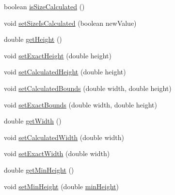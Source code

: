 \begin{DoxyCompactItemize}
\item 
boolean \hyperlink{classorg_1_1tzi_1_1use_1_1gui_1_1views_1_1diagrams_1_1elements_1_1_placeable_node_a0e797fd4108ca62f9ea10d1478273c78}{is\-Size\-Calculated} ()
\item 
void \hyperlink{classorg_1_1tzi_1_1use_1_1gui_1_1views_1_1diagrams_1_1elements_1_1_placeable_node_ae72445d4803c4eb6203d8f222cd99246}{set\-Size\-Is\-Calculated} (boolean new\-Value)
\item 
double \hyperlink{classorg_1_1tzi_1_1use_1_1gui_1_1views_1_1diagrams_1_1elements_1_1_placeable_node_a3f1e17dd59e232348e59858bba8645ed}{get\-Height} ()
\item 
void \hyperlink{classorg_1_1tzi_1_1use_1_1gui_1_1views_1_1diagrams_1_1elements_1_1_placeable_node_ad3166569d3ffc67d1f14fbac8b733ad4}{set\-Exact\-Height} (double height)
\item 
void \hyperlink{classorg_1_1tzi_1_1use_1_1gui_1_1views_1_1diagrams_1_1elements_1_1_placeable_node_a2ca255a92f6450ae6dc63742a5f3828e}{set\-Calculated\-Height} (double height)
\item 
void \hyperlink{classorg_1_1tzi_1_1use_1_1gui_1_1views_1_1diagrams_1_1elements_1_1_placeable_node_a61392a53892e2e72f9973f2ab5c0fc48}{set\-Calculated\-Bounds} (double width, double height)
\item 
void \hyperlink{classorg_1_1tzi_1_1use_1_1gui_1_1views_1_1diagrams_1_1elements_1_1_placeable_node_a303f02a878c532e867d8ce2e0e8a3322}{set\-Exact\-Bounds} (double width, double height)
\item 
double \hyperlink{classorg_1_1tzi_1_1use_1_1gui_1_1views_1_1diagrams_1_1elements_1_1_placeable_node_a4f60e88c8c835e9d5e6822c8ea433c67}{get\-Width} ()
\item 
void \hyperlink{classorg_1_1tzi_1_1use_1_1gui_1_1views_1_1diagrams_1_1elements_1_1_placeable_node_a56437e4a70913d50e5e55f1a42e7d51c}{set\-Calculated\-Width} (double width)
\item 
void \hyperlink{classorg_1_1tzi_1_1use_1_1gui_1_1views_1_1diagrams_1_1elements_1_1_placeable_node_abdc719728811174700602a060df4b6a0}{set\-Exact\-Width} (double width)
\item 
double \hyperlink{classorg_1_1tzi_1_1use_1_1gui_1_1views_1_1diagrams_1_1elements_1_1_placeable_node_afdcb813d540efe8fc69f50c0acb6a4a5}{get\-Min\-Height} ()
\item 
void \hyperlink{classorg_1_1tzi_1_1use_1_1gui_1_1views_1_1diagrams_1_1elements_1_1_placeable_node_a8bed27170a52502058bafac2bd23a85c}{set\-Min\-Height} (double \hyperlink{classorg_1_1tzi_1_1use_1_1gui_1_1views_1_1diagrams_1_1elements_1_1_placeable_node_abc6784edb9c4b5ff121085d966b15dc5}{min\-Height})

\end{DoxyCompactItemize}
